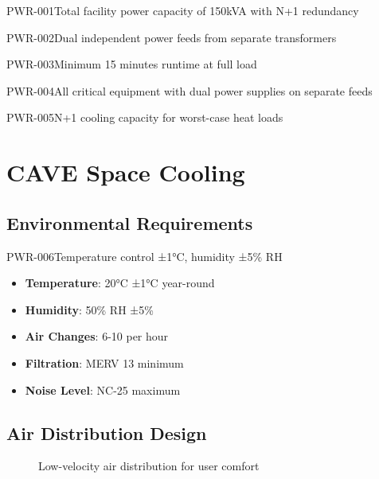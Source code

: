 \begin{requirement}{PWR-001}{Total facility power capacity of 150kVA with N+1 redundancy}
\begin{requirement}{PWR-002}{Dual independent power feeds from separate transformers}
\begin{requirement}{PWR-003}{Minimum 15 minutes runtime at full load}
\begin{requirement}{PWR-004}{All critical equipment with dual power supplies on separate feeds}
\begin{requirement}{PWR-005}{N+1 cooling capacity for worst-case heat loads}
\section{CAVE Space Cooling}

\subsection{Environmental Requirements}

\begin{requirement}{PWR-006}{Temperature control ±1°C, humidity ±5\% RH}

\begin{itemize}
    \item \textbf{Temperature}: 20°C ±1°C year-round
    \item \textbf{Humidity}: 50\% RH ±5\%
    \item \textbf{Air Changes}: 6-10 per hour
    \item \textbf{Filtration}: MERV 13 minimum
    \item \textbf{Noise Level}: NC-25 maximum
\end{itemize}

\subsection{Air Distribution Design}

\begin{figure}[H]
\centering
{}
\caption{Low-velocity air distribution for user comfort}
\end{figure}


\end{requirement}
\end{requirement}
\end{requirement}
\end{requirement}
\end{requirement}
\end{requirement}
